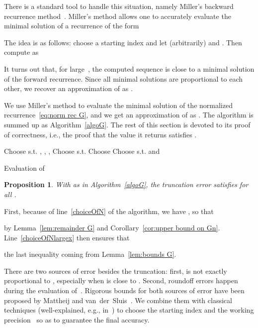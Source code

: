 \documentclass[10pt, conference]{IEEEtran}
\newtheorem{proposition}{Proposition}
\begin{document}
There is a standard tool to handle this situation, namely Miller's backward recurrence method~{\cite{BickleyComrieMillerSadlerThompson1952,Wimp1984}}. Miller's method allows one to accurately evaluate the minimal solution  of a recurrence of the form

The idea is as follows: choose a starting index  and let (arbitrarily)  and . Then compute  as

It turns out that, for large~, the computed sequence  is close to a minimal solution of the forward recurrence. Since all minimal solutions are proportional to each other, we recover an approximation of  as .

We use Miller's method to evaluate the minimal solution  of the normalized recurrence~\eqref{eq:norm rec G}, and we get an approximation of  as .
The algorithm is summed up as Algorithm~\ref{algoG}. The rest of this section is devoted to its proof of correctness, i.e., the proof that the value  it returns satisfies .




\begin{algorithm}[t]
Choose  s.t.
  ,
  ,
  ,
   \;
\;
Choose  s.t. \;
    Choose \;
Choose  s.t.  and \;
  \KwRet {}\;
  \caption{Evaluation of }
  \label{algoG}
\end{algorithm}


\begin{proposition}
  \label{prop:N well chosen}
  With  as in Algorithm~\ref{algoG}, the truncation error satisfies  for all .
\end{proposition}
\begin{IEEEproof}
    First, because of line~\ref{choiceOfN} of the algorithm, we have , so that
    
    by Lemma~\ref{lem:remainder G} and Corollary~\ref{cor:upper bound on Gn}.
    Line~\ref{choiceOfNlargex} then ensures that 

  the last inequality coming from Lemma~\ref{lem:bounds G}.
\end{IEEEproof}



There are two sources of error besides the truncation: first,  is not exactly proportional to , especially when  is close to . Second, roundoff errors happen during the evaluation of~.
Rigorous bounds for both sources of error have been proposed by Mattheij and van~der~Sluis~\cite{MvdS}.
We combine them with classical techniques (well-explained, e.g., in~\cite{Chevillard2012}) to choose the starting index  and the working precision~ so as to guarantee the final accuracy.
\end{document}
